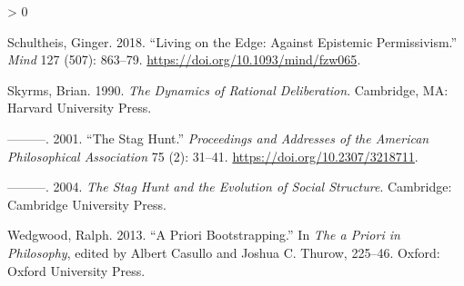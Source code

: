 \documentclass[
  12pt,
]{article}
\newlength{\cslhangindent}
\newenvironment{CSLReferences}[2] %
 {%
  \setlength{\parindent}{0pt}
  \ifodd #1 \everypar{\setlength{\hangindent}{\cslhangindent}}\ignorespaces\fi
  \ifnum #2 > 0
  \setlength{\parskip}{#2\baselineskip}
  \fi
 }%
 {}
\begin{document}
\begin{CSLReferences}{1}{0}
\leavevmode\hypertarget{ref-Schultheis2018}{}%
Schultheis, Ginger. 2018. {``Living on the Edge: Against Epistemic
Permissivism.''} \emph{Mind} 127 (507): 863--79.
\url{https://doi.org/10.1093/mind/fzw065}.

\leavevmode\hypertarget{ref-Skyrms1990}{}%
Skyrms, Brian. 1990. \emph{The Dynamics of Rational Deliberation}.
Cambridge, MA: Harvard University Press.

\leavevmode\hypertarget{ref-Skyrms2001}{}%
---------. 2001. {``The Stag Hunt.''} \emph{Proceedings and Addresses of
the American Philosophical Association} 75 (2): 31--41.
\url{https://doi.org/10.2307/3218711}.

\leavevmode\hypertarget{ref-Skyrms2004}{}%
---------. 2004. \emph{The Stag Hunt and the Evolution of Social
Structure}. Cambridge: {C}ambridge {U}niversity {P}ress.

\leavevmode\hypertarget{ref-Wedgwood2013}{}%
Wedgwood, Ralph. 2013. {``A Priori Bootstrapping.''} In \emph{The a
Priori in Philosophy}, edited by Albert Casullo and Joshua C. Thurow,
225--46. Oxford: Oxford University Press.

\end{CSLReferences}
\end{document}
